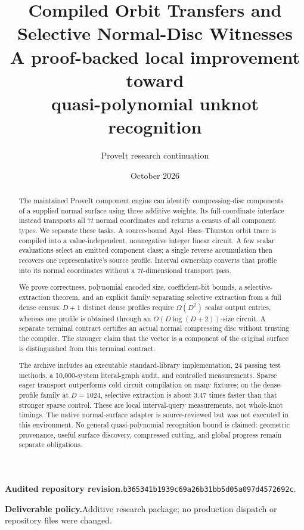 \documentclass[11pt]{article}
\title{\textbf{Compiled Orbit Transfers and\\Selective Normal-Disc Witnesses}\\[0.6em]
\large A proof-backed local improvement toward\\quasi-polynomial unknot recognition}
\author{ProveIt research continuation}
\date{October 2026}
\theoremstyle{definition}\newtheorem{definition}[theorem]{Definition}
\theoremstyle{remark}\newtheorem{remark}[theorem]{Remark}
\newcommand{\commit}{\texttt{b365341b1939c69a26b31bb5d05a097d4572692c}}
\begin{document}
\maketitle
\begin{abstract}
The maintained ProveIt component engine can identify compressing-disc components
of a supplied normal surface using three additive weights. Its full-coordinate
interface instead transports all $7t$ normal coordinates and returns a census of
all component types. We separate these tasks. A source-bound Agol--Hass--Thurston
orbit trace is compiled into a value-independent, nonnegative integer linear
circuit. A few scalar evaluations select an emitted component class; a single
reverse accumulation then recovers one representative's source profile. Interval
ownership converts that profile into its normal coordinates without a
$7t$-dimensional transport pass.

We prove correctness, polynomial encoded size, coefficient-bit bounds, a
selective-extraction theorem, and an explicit family separating selective
extraction from a full dense census: $D+1$ distinct dense profiles require
$\Omega(D^2)$ scalar output entries, whereas one profile is obtained through an
$O(D\log(D+2))$-size circuit. A separate terminal contract certifies an actual
normal compressing disc without trusting the compiler. The stronger claim that
the vector is a component of the original surface is distinguished from this
terminal contract.

The archive includes an executable standard-library implementation, 24 passing
test methods, a 10,000-system literal-graph audit, and controlled measurements.
Sparse eager transport outperforms cold circuit compilation on many fixtures;
on the dense-profile family at $D=1024$, selective extraction is about $3.47$
times faster than that stronger sparse control. These are local interval-query
measurements, not whole-knot timings. The native normal-surface adapter is
source-reviewed but was not executed in this environment. No general
quasi-polynomial recognition bound is claimed: geometric provenance, useful
surface discovery, compressed cutting, and global progress remain separate
obligations.
\end{abstract}
\vspace{0.4em}
\noindent\textbf{Audited repository revision.}\quad\commit.
\par\noindent\textbf{Deliverable policy.}\quad Additive research package; no production dispatch
or repository files were changed.
\clearpage
\setcounter{tocdepth}{1}
\tableofcontents
\vspace{1.3em}
\end{document}

